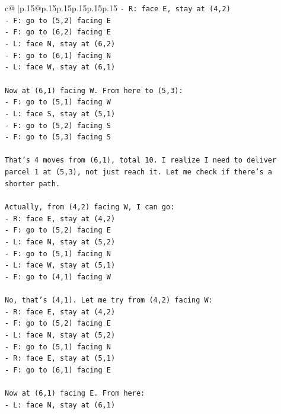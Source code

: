 \documentclass{article}
\begin{document}
{\begin{supertabular}{c@{$\;$}|p{.15\linewidth}@{}p{.15\linewidth}p{.15\linewidth}p{.15\linewidth}p{.15\linewidth}p{.15\linewidth}}
{{{\texttt{{-} R: face E, stay at (4,2)} \\
\texttt{{-} F: go to (5,2) facing E} \\
\texttt{{-} F: go to (6,2) facing E} \\
\texttt{{-} L: face N, stay at (6,2)} \\
\texttt{{-} F: go to (6,1) facing N} \\
\texttt{{-} L: face W, stay at (6,1)} \\
\\ 
\texttt{Now at (6,1) facing W. From here to (5,3):} \\
\texttt{{-} F: go to (5,1) facing W} \\
\texttt{{-} L: face S, stay at (5,1)} \\
\texttt{{-} F: go to (5,2) facing S} \\
\texttt{{-} F: go to (5,3) facing S} \\
\\ 
\texttt{That's 4 moves from (6,1), total 10. I realize I need to deliver parcel 1 at (5,3), not just reach it. Let me check if there's a shorter path.} \\
\\ 
\texttt{Actually, from (4,2) facing W, I can go:} \\
\texttt{{-} R: face E, stay at (4,2)} \\
\texttt{{-} F: go to (5,2) facing E} \\
\texttt{{-} L: face N, stay at (5,2)} \\
\texttt{{-} F: go to (5,1) facing N} \\
\texttt{{-} L: face W, stay at (5,1)} \\
\texttt{{-} F: go to (4,1) facing W} \\
\\ 
\texttt{No, that's (4,1). Let me try from (4,2) facing W:} \\
\texttt{{-} R: face E, stay at (4,2)} \\
\texttt{{-} F: go to (5,2) facing E} \\
\texttt{{-} L: face N, stay at (5,2)} \\
\texttt{{-} F: go to (5,1) facing N} \\
\texttt{{-} R: face E, stay at (5,1)} \\
\texttt{{-} F: go to (6,1) facing E} \\
\\ 
\texttt{Now at (6,1) facing E. From here:} \\
\texttt{{-} L: face N, stay at (6,1)} \\
}}}
\end{supertabular}}
\end{document}
